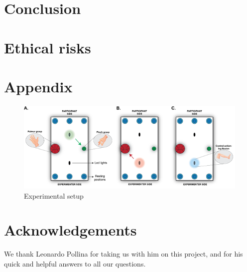 \documentclass[10pt,conference,compsocconf]{IEEEtran}
\begin{document}
\section{Conclusion}
\label{sec:conclusion}


\section{Ethical risks}




\section{Appendix}

\begin{figure}[h!]
    \center
    \includegraphics[width=\linewidth]{images/2024-12-11-13-41-23.png}
    \caption{Experimental setup}
\end{figure}
\FloatBarrier




\section*{Acknowledgements}
We thank Leonardo Pollina for taking us with him on this project, and for his quick and helpful answers to all our questions.



\end{document}

